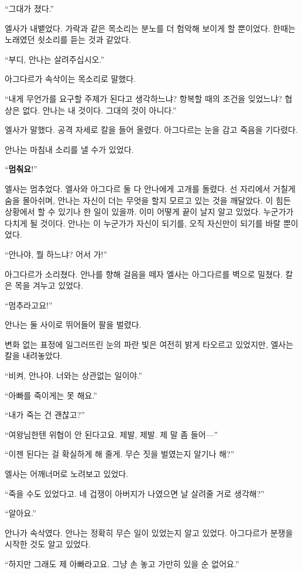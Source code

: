 ``그대가 졌다.''

엘사가 내뱉었다. 가락과 같은 목소리는 분노를 더 험악해 보이게 할 뿐이었다. 한때는 노래였던 쇳소리를 듣는 것과 같았다.

``부디, 안나는 살려주십시오.''

아그다르가 속삭이는 목소리로 말했다.

``내게 무언가를 요구할 주제가 된다고 생각하느냐? 항복할 때의 조건을 잊었느냐? 협상은 없다. 안나는 내 것이다. 그대의 것이 아니다.''

엘사가 말했다. 공격 자세로 칼을 들어 올렸다. 아그다르는 눈을 감고 죽음을 기다렸다.

안나는 마침내 소리를 낼 수가 있었다.

``\textbf{멈춰요}!''

엘사는 멈추었다. 엘사와 아그다르 둘 다 안나에게 고개를 돌렸다. 선 자리에서 거칠게 숨을 몰아쉬며, 안나는 자신이 더는 무엇을 할지 모르고 있는 것을 깨달았다. 이 힘든 상황에서 할 수 있기나 한 일이 있을까. 이미 어떻게 끝이 날지 알고 있었다. 누군가가 다치게 될 것이다. 안나는 이 누군가가 자신이 되기를, 오직 자신만이 되기를 바랄 뿐이었다.

``안나야, 뭘 하느냐? 어서 가!''

아그다르가 소리쳤다. 안나를 향해 걸음을 떼자 엘사는 아그다르를 벽으로 밀쳤다. 칼은 목을 겨누고 있었다.

``멈추라고요!''

안나는 둘 사이로 뛰어들어 팔을 벌렸다.

변화 없는 표정에 일그러뜨린 눈의 파란 빛은 여전히 밝게 타오르고 있었지만, 엘사는 칼을 내려놓았다.

``비켜, 안나야. 너와는 상관없는 일이야.''

``아빠를 죽이게는 못 해요.''

``내가 죽는 건 괜찮고?''

``여왕님한텐 위협이 안 된다고요. 제발, 제발. 제 말 좀 들어—''

``이젠 된다는 걸 확실하게 해 줄게. 무슨 짓을 벌였는지 알기나 해?''

엘사는 어깨너머로 노려보고 있었다.

``죽을 수도 있었다고. 네 겁쟁이 아버지가 나였으면 날 살려줄 거로 생각해?''

``알아요.''

안나가 속삭였다. 안나는 정확히 무슨 일이 있었는지 알고 있었다. 아그다르가 분쟁을 시작한 것도 알고 있었다.

``하지만 그래도 제 아빠라고요. 그냥 손 놓고 가만히 있을 순 없어요.''

